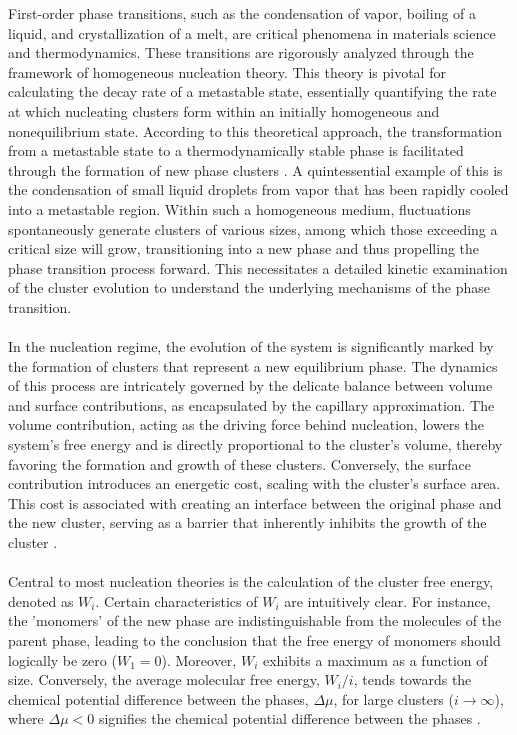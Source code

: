 First-order phase transitions, such as the condensation of vapor, boiling of a liquid, and crystallization of a melt, are critical phenomena in materials science and thermodynamics. These transitions are rigorously analyzed through the framework of homogeneous nucleation theory. This theory is pivotal for calculating the decay rate of a metastable state, essentially quantifying the rate at which nucleating clusters form within an initially homogeneous and nonequilibrium state. According to this theoretical approach, the transformation from a metastable state to a thermodynamically stable phase is facilitated through the formation of new phase clusters \cite{Larissa}. A quintessential example of this is the condensation of small liquid droplets from vapor that has been rapidly cooled into a metastable region. Within such a homogeneous medium, fluctuations spontaneously generate clusters of various sizes, among which those exceeding a critical size will grow, transitioning into a new phase and thus propelling the phase transition process forward. This necessitates a detailed kinetic examination of the cluster evolution to understand the underlying mechanisms of the phase transition.

\paragraph{} In the nucleation regime, the evolution of the system is significantly marked by the formation of clusters that represent a new equilibrium phase. The dynamics of this process are intricately governed by the delicate balance between volume and surface contributions, as encapsulated by the capillary approximation. The volume contribution, acting as the driving force behind nucleation, lowers the system's free energy and is directly proportional to the cluster's volume, thereby favoring the formation and growth of these clusters. Conversely, the surface contribution introduces an energetic cost, scaling with the cluster's surface area. This cost is associated with creating an interface between the original phase and the new cluster, serving as a barrier that inherently inhibits the growth of the cluster \cite{Clouet1}.

\paragraph{} Central to most nucleation theories is the calculation of the cluster free energy, denoted as \(W_i\). Certain characteristics of \(W_i\) are intuitively clear. For instance, the 'monomers' of the new phase are indistinguishable from the molecules of the parent phase, leading to the conclusion that the free energy of monomers should logically be zero (\(W_1 = 0\)). Moreover, \(W_i\) exhibits a maximum as a function of size. Conversely, the average molecular free energy, \(W_i/i\), tends towards the chemical potential difference between the phases, \(\Delta \mu\), for large clusters (\(i \rightarrow \infty\)), where \(\Delta \mu < 0\) signifies the chemical potential difference between the phases \cite{Laszlo1}.

